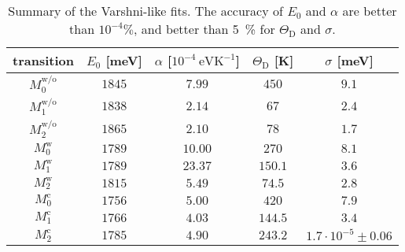 \begin{table}
	\centering
	\caption{Summary of the Varshni-like fits. The accuracy of $E_0$ and $\alpha$ are better than $10^{-4}\%$, and better than 5~\% for $\Theta_\mathrm{D}$ and $\sigma$.}
	\begin{tabularx}{0.9\textwidth}{cCCcc}
		\toprule
		
		transition & $E_0$ [meV]& $\alpha$ [$10^{-4}~\mathrm{eVK^{-1}}$]& $\Theta_\mathrm{D}$ [K]& $\sigma$ [meV]\\ 	
		\midrule
		\midrule
		$M_0^\mathrm{w/o}$& $1845$ & $7.99$& $450$&$9.1$\\
		$M_1^\mathrm{w/o}$& $1838$ & $2.14$& $67$&$2.4$\\
		$M_2^\mathrm{w/o}$ & $1865$ & $2.10$& $78$& $1.7$\\ 
		
		\midrule
		$M_0^\mathrm{w}$& $1789$ & $10.00$& $270$& $8.1$\\
		$M_1^\mathrm{w}$& $1789$ & $23.37$& $150.1$&$3.6$\\
		$M_2^\mathrm{w}$ & $1815$& $5.49$& $74.5$& $2.8$\\ 
		
		\midrule
		$M_0^\mathrm{c}$& $1756$ & $5.00$& $420$& $7.9$\\
		$M_1^\mathrm{c}$& $1766$ & $4.03$& $144.5$& $3.4$\\
		$M_2^\mathrm{c}$ & $1785$ & $4.90$& $243.2$& $1.7\cdot 10^{-5}\pm0.06$\\%
		
		\bottomrule
	\end{tabularx}\label{tab:Varshni}
\end{table}

